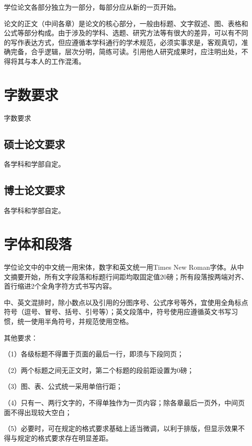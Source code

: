 学位论文各部分独立为一部分，每部分应从新的一页开始。

论文的正文（中间各章）是论文的核心部分，一般由标题、文字叙述、图、表格和公式等部分构成。由于涉及的学科、选题、研究方法等有很大的差异，可以有不同的写作表达方式，但应遵循本学科通行的学术规范，必须实事求是，客观真切，准确完备，合乎逻辑，层次分明，简练可读。引用他人研究成果时，应注明出处，不得将其与本人的工作混淆。


\section{字数要求}
字数要求


\subsection{硕士论文要求}

各学科和学部自定。

\subsection{博士论文要求}

各学科和学部自定。

\section{字体和段落}
学位论文中的中文统一用宋体，数字和英文统一用Times New Roman字体。从中文摘要开始，所有文字段落和标题行间距均取固定值20磅；所有段落按两端对齐、首行缩进2个全角字符方式书写内容。

中、英文混排时，除小数点以及引用的分图序号、公式序号等外，宜使用全角标点符号（逗号、冒号、括号、引号等）；英文段落中，符号使用应遵循英文书写习惯，统一使用半角符号，并规范使用空格。

其他要求：

（1）各级标题不得置于页面的最后一行，即须与下段同页；

（2）两个标题之间无正文时，第二个标题的段前距设置为0磅；
 
（3）图、表、公式统一采用单倍行距；

（4）只有一、两行文字的，不得单独作为一页内容；除各章最后一页外，中间页面不得出现较大空白；

（5）必要时，可在规定的格式要求基础上适当微调，以利于排版，但显示效果不得与规定的格式要求存在明显差距。

\vspace{-0.15cm}


